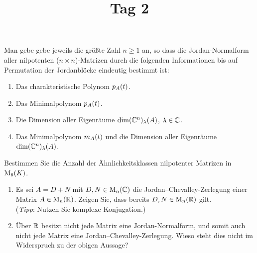 \documentclass[a4paper, 10pt]{scrartcl}
\title{Tag 2}
\author{}
\date{}
\begin{document}
\begin{question}[subtitle = Bestimmtheit der Jordan-Normalform]
  Man gebe gebe jeweils die größte Zahl $n \geq 1$ an, so dass die Jordan-Normalform aller nilpotenten ($n \times n$)-Matrizen durch die folgenden Informationen bis auf Permutation der Jordanblöcke eindeutig bestimmt ist:
  \begin{enumerate}
    \item
      Das charakteristische Polynom $p_{A}(t)$.
    \item
      Das Minimalpolynom $p_{A}(t)$.
    \item
      Die Dimension aller Eigenräume $\dim (\mathbb{C}^n)_{\lambda}(A)$, $\lambda \in \mathbb{C}$.
    \item
      Das Minimalpolynom $m_{A}(t)$ und die Dimension aller Eigenräume $\dim (\mathbb{C}^n)_{\lambda}(A)$.
  \end{enumerate}
\end{question}










\begin{question}[subtitle = Ähnlichkeitsklassen nilpotenter Matrizen]
  Bestimmen Sie die Anzahl der Ähnlichkeitsklassen nilpotenter Matrizen in $\operatorname{M}_{6}(K)$.
\end{question}





\begin{question}[subtitle = Jordan--Chevalley-Zerlegung reeller Matrizen]
  \begin{enumerate}
    \item
      Es sei $A = D + N$ mit $D, N \in \operatorname{M}_{n}(\mathbb{C})$ die Jordan--Chevalley-Zerlegung einer Matrix $A \in \operatorname{M}_{n}(\mathbb{R})$.
      Zeigen Sie, dass bereits $D, N \in \operatorname{M}_{n}(\mathbb{R})$ gilt.
      \\
      (\emph{Tipp}:
       Nutzen Sie komplexe Konjugation.)
    \item
      Über $\mathbb{R}$ besitzt nicht jede Matrix eine Jordan-Normalform, und somit auch nicht jede Matrix eine Jordan--Chevalley-Zerlegung.
      Wieso steht dies nicht im Widerspruch zu der obigen Aussage?
  \end{enumerate}
\end{question}
\end{document}
